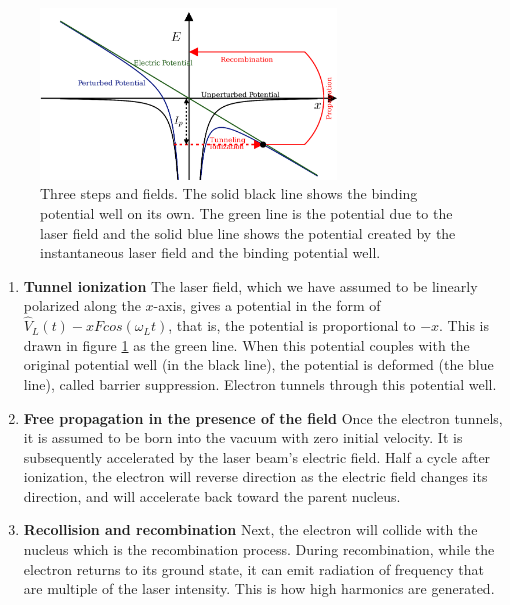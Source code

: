 \documentclass[12pt]{article}
\begin{document}
\begin{figure}[h]
    \centering
    \includegraphics[width=0.7\textwidth]{images/three_step_one.png}
    \caption{Three steps and fields. The solid black line shows the binding potential well on its own. The green line is the potential due to the laser field and the solid blue line shows the potential created by the instantaneous laser field and the binding potential well.  }
    \label{fig:3-step-1}
\end{figure}
\begin{enumerate}
    \item \textbf{Tunnel ionization} The laser field, which we have assumed to be linearly polarized along the $x$-axis, gives a potential in the form of \(\hat V_L(t)-xFcos(\omega_Lt)\), that is, the potential is proportional to $-x$. This is drawn in figure \ref{fig:3-step-1} as the green line. When this potential couples with the original potential well (in the black line), the potential is deformed (the blue line), called barrier suppression. Electron tunnels through this potential well.
    \item \textbf{Free propagation in the presence of the field} Once the electron tunnels, it is assumed to be born into the vacuum with zero initial velocity. It is subsequently accelerated by the laser beam's electric field. Half a cycle after ionization, the electron will reverse direction as the electric field changes its direction, and will accelerate back toward the parent nucleus.
    \item \textbf{Recollision and recombination} Next, the electron will collide with the nucleus which is the recombination process. During recombination, while the electron returns to its ground state, it can emit radiation of frequency that are multiple of the laser intensity. This is how high harmonics are generated.
\end{enumerate}
\end{document}
